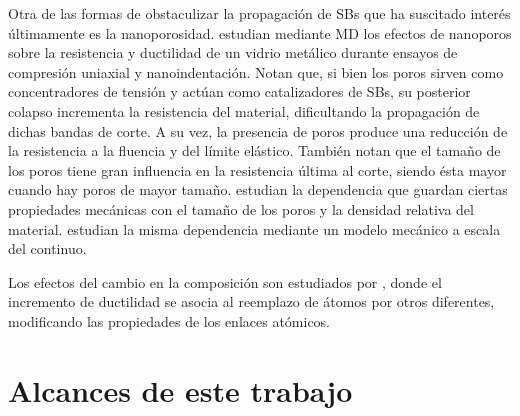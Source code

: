 Otra de las formas de obstaculizar la propagación de SBs que ha suscitado interés últimamente es la nanoporosidad. \cite{wang10} estudian mediante MD los efectos de nanoporos sobre la resistencia y ductilidad de un vidrio metálico durante ensayos de compresión uniaxial y nanoindentación. Notan que, si bien los poros sirven como concentradores de tensión y actúan como catalizadores de SBs, su posterior colapso incrementa la resistencia del material, dificultando la propagación de dichas bandas de corte. A su vez, la presencia de poros produce una reducción de la resistencia a la fluencia y del límite elástico. También notan que el tamaño de los poros tiene gran influencia en la resistencia última al corte, siendo ésta mayor cuando hay poros de mayor tamaño. \cite{yuan14} estudian la dependencia que guardan ciertas propiedades mecánicas con el tamaño de los poros y la densidad relativa del material. \cite{sarac14} estudian la misma dependencia mediante un modelo mecánico a escala del continuo.

Los efectos del cambio en la composición son estudiados por \cite{Zheng12}, donde el incremento de ductilidad se asocia al reemplazo de átomos por otros diferentes, modificando las propiedades de los enlaces atómicos.






\section{Alcances de este trabajo}
\label{S1_3}

